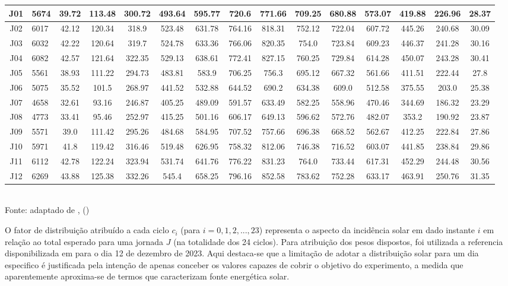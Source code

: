 \begin{table}[h]
\begin{tabular}{ c l | *{13}{c} }
	\hline
	J01 & 5674 & 39.72 & 113.48 & 300.72 & 493.64 & 595.77 & 720.6 & 771.66 & 709.25 & 680.88 & 573.07 & 419.88 & 226.96 & 28.37\\
	\hline
	J02 & 6017 & 42.12 & 120.34 & 318.9 & 523.48 & 631.78 & 764.16 & 818.31 & 752.12 & 722.04 & 607.72 & 445.26 & 240.68 & 30.09 \\
	\hline
	J03 & 6032 &  42.22 & 120.64 & 319.7 & 524.78 & 633.36 & 766.06 & 820.35 & 754.0 & 723.84 & 609.23 & 446.37 & 241.28 & 30.16 \\
	\hline
	J04 & 6082 & 42.57 & 121.64 & 322.35 & 529.13 & 638.61 & 772.41 & 827.15 & 760.25 & 729.84 & 614.28 & 450.07 & 243.28 & 30.41 \\
	\hline
	J05 & 5561 & 38.93 & 111.22 & 294.73 & 483.81 & 583.9 & 706.25 & 756.3 & 695.12 & 667.32 & 561.66 & 411.51 & 222.44 & 27.8\\
	\hline
	J06 & 5075 & 35.52 & 101.5 & 268.97 & 441.52 & 532.88 & 644.52 & 690.2 & 634.38 & 609.0 & 512.58 & 375.55 & 203.0 & 25.38 \\
	\hline
	J07 & 4658 & 32.61 & 93.16 & 246.87 & 405.25 & 489.09 & 591.57 & 633.49 & 582.25 & 558.96 & 470.46 & 344.69 & 186.32 & 23.29 \\
	\hline
	J08 & 4773 & 33.41 & 95.46 & 252.97 & 415.25 & 501.16 & 606.17 & 649.13 & 596.62 & 572.76 & 482.07 & 353.2 & 190.92 & 23.87\\
	\hline
	J09 & 5571 & 39.0 & 111.42 & 295.26 & 484.68 & 584.95 & 707.52 & 757.66 & 696.38 & 668.52 & 562.67 & 412.25 & 222.84 & 27.86\\
	\hline
	J10 & 5971 & 41.8 & 119.42 & 316.46 & 519.48 & 626.95 & 758.32 & 812.06 & 746.38 & 716.52 & 603.07 & 441.85 & 238.84 & 29.86 \\
	\hline
	J11 & 6112 & 42.78 & 122.24 & 323.94 & 531.74 & 641.76 & 776.22 & 831.23 & 764.0 & 733.44 & 617.31 & 452.29 & 244.48 & 30.56 \\
	\hline
	J12 & 6269 & 43.88 & 125.38 & 332.26 & 545.4 & 658.25 & 796.16 & 852.58 & 783.62 & 752.28 & 633.17 & 463.91 & 250.76 & 31.35 \\
\bottomrule
\end{tabular}
\label{table:cap6distribuicaonatal}
\\
\footnotesize Fonte: adaptado de \citeauthor{martins2017atlas}, (\citeyear{martins2017atlas})

\end{table}
\endgroup

O fator de distribuição atribuído a cada ciclo $c_i$ (para $i=0,1,2,...,23$) representa o aspecto da incidência solar em  dado instante $i$ em relação ao total esperado para uma jornada $J$ (na totalidade dos 24 ciclos). Para atribuição dos pesos dispostos, foi utilizada a referencia disponibilizada em  para o dia 12 de dezembro de 2023. Aqui destaca-se que a limitação de adotar a distribuição solar para um dia especifico é justificada pela intenção de apenas conceber os valores capazes de cobrir o objetivo do experimento, a medida que aparentemente aproxima-se de termos que caracterizam fonte energética solar. 

